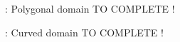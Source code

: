 \begin{frame}{\appendixname~\theappendixframenumber~: Polygonal domain}
	TO COMPLETE !
\end{frame}
\addtocounter{appendixframenumber}{1}

\begin{frame}{\appendixname~\theappendixframenumber~: Curved domain}
	TO COMPLETE !
\end{frame}
\addtocounter{appendixframenumber}{1}